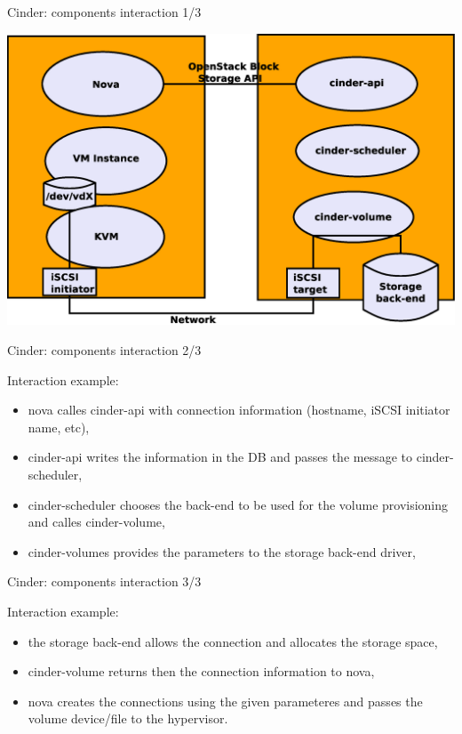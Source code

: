\documentclass[english,serif,mathserif]{beamer}
\begin{document}
\begin{frame}{Cinder: components interaction 1/3}

\centerline{\includegraphics[scale=0.30]{cinder.eps}}

\end{frame}

\begin{frame}{Cinder: components interaction 2/3}

Interaction example:

\begin{itemize}
\item nova calles cinder-api with connection information (hostname, iSCSI initiator name, etc),
\item cinder-api writes the information in the DB and passes the message to cinder-scheduler,
\item cinder-scheduler chooses the back-end to be used for the volume provisioning and calles cinder-volume,
\item cinder-volumes provides the parameters to the storage back-end driver,
\end{itemize}

\end{frame}

\begin{frame}{Cinder: components interaction 3/3}

Interaction example:

\begin{itemize}
\item the storage back-end allows the connection and allocates the storage space,
\item cinder-volume returns then the connection information to nova,
\item nova creates the connections using the given parameteres and passes the volume device/file to the hypervisor.
\end{itemize}

\end{frame}
\end{document}
